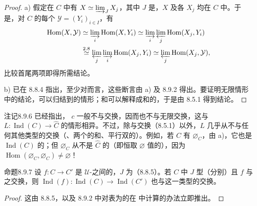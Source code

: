 \begin{proof}
 a) 假定在 $C$ 中有 $X\simeq\varinjlim_JX_j$，其中 $J$ 是，$X$ 及各 $X_j$ 均在 $C$ 中。于是，对 $C$ 的每个 $\mathcal Y=(Y_i)_{i\in I}$，有
\[
\begin{aligned}
\operatorname{Hom}(X,\mathcal Y)
&\simeq\varinjlim_i\operatorname{Hom}(X,Y_i)
\simeq\varinjlim_i\varprojlim_j\operatorname{Hom}(X_j,Y_i)\\
&\overset{2.8}{\simeq}\varprojlim_j\varinjlim_i\operatorname{Hom}(X_j,Y_i)
\simeq\varprojlim_j\operatorname{Hom}(X_j,\mathcal Y),
\end{aligned}
\]
比较首尾两项即得所需结论。

 b) 已在 8.8.4 指出，至少对而言，这些断言由 a) 及 8.9.2 得出。要证明无限情形中的结论，可以归结到的情形；和可以解释成和的，于是由 8.5.1 得到结论。
\end{proof}
\begin{SGAresult}{注记}{8.9.6}
已经指出， $c$ 一般不与交换，因而也不与无限交换，这与 $L:\operatorname{Ind}(C)\to\widehat C$ 的情形相异。不过，除与交换（8.5.1）以外，$L$ 几乎从不与任何其他类型的交换（、两个的和、平行双的）。例如，若 $C$ 有 $\varnothing_C$，由 a)，它也是 $\operatorname{Ind}(C)$ 的；但 $\varnothing_C$ 从不是 $\widehat C$ 的（即恒取 $\varnothing$ 值的），因为 $\operatorname{Hom}(\varnothing_C,\varnothing_C)\ne\varnothing$！
\end{SGAresult}
\begin{SGAresult}{命题}{8.9.7}
设 $f:C\to C'$ 是 $\mathcal U$-之间的，$J$ 为（8.8.5）。若 $C$ 中 $J$ 型（分别）且 $f$ 与之交换，则 $\operatorname{Ind}(f):\operatorname{Ind}(C)\to\operatorname{Ind}(C')$ 也与这一类型的交换。
\end{SGAresult}
\begin{proof}
这由 8.8.5，以及 8.9.2 中对表为的在 中计算的办法立即推出。
\end{proof}
